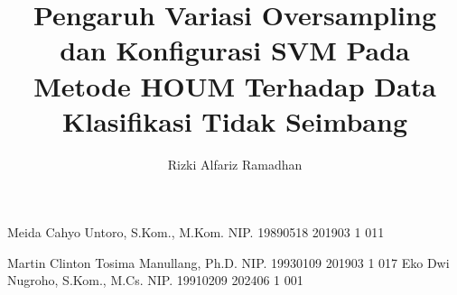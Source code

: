 \documentclass[12pt, a4paper, onecolumn, oneside, final]{report}
\begin{document}

    
    \title{Pengaruh Variasi Oversampling dan Konfigurasi SVM Pada Metode HOUM Terhadap Data Klasifikasi Tidak Seimbang} %
    
    \author{Rizki Alfariz Ramadhan}		%
	
	\dosbingA%
		{Meida Cahyo Untoro, S.Kom., M.Kom.}%
		{NIP. 19890518 201903 1 011}				%
		
	\pengujiA%
		{Martin Clinton Tosima Manullang, Ph.D.}%
		{NIP. 19930109 201903 1 017}				%
	\pengujiB%
		{Eko Dwi Nugroho, S.Kom., M.Cs.}%
		{NIP. 19910209 202406 1 001}				%

	\sloppy %
    \setcounter{page}{1} %







    
%    
%   

    \tableofcontents
    \pagebreak
    \listoftables
    \pagebreak
    \listoffigures
    \pagebreak
    \listofmyequations
%    
    \pagebreak
    
\end{document}
